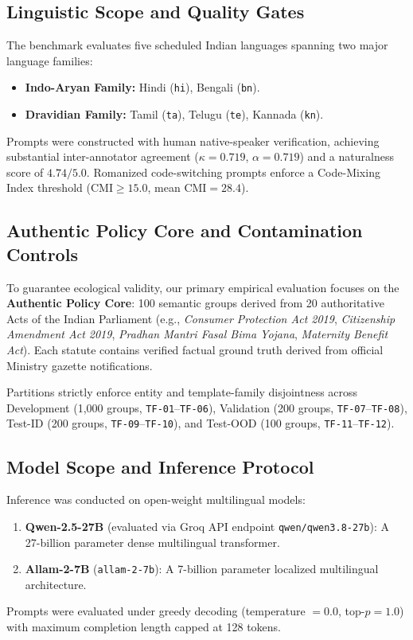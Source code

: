 \documentclass[11pt]{article}
\begin{document}
\subsection{Linguistic Scope and Quality Gates}
The benchmark evaluates five scheduled Indian languages spanning two major language families:
\begin{itemize}
    \item \textbf{Indo-Aryan Family:} Hindi (\texttt{hi}), Bengali (\texttt{bn}).
    \item \textbf{Dravidian Family:} Tamil (\texttt{ta}), Telugu (\texttt{te}), Kannada (\texttt{kn}).
\end{itemize}
Prompts were constructed with human native-speaker verification, achieving substantial inter-annotator agreement ($\kappa = 0.719$, $\alpha = 0.719$) and a naturalness score of $4.74 / 5.0$. Romanized code-switching prompts enforce a Code-Mixing Index \citep{gamback2014comparing} threshold ($\text{CMI} \ge 15.0$, mean $\text{CMI} = 28.4$).

\subsection{Authentic Policy Core and Contamination Controls}
To guarantee ecological validity, our primary empirical evaluation focuses on the \textbf{Authentic Policy Core}: 100 semantic groups derived from 20 authoritative Acts of the Indian Parliament (e.g., \textit{Consumer Protection Act 2019}, \textit{Citizenship Amendment Act 2019}, \textit{Pradhan Mantri Fasal Bima Yojana}, \textit{Maternity Benefit Act}). Each statute contains verified factual ground truth derived from official Ministry gazette notifications. 

Partitions strictly enforce entity and template-family disjointness across Development (1,000 groups, \texttt{TF-01}--\texttt{TF-06}), Validation (200 groups, \texttt{TF-07}--\texttt{TF-08}), Test-ID (200 groups, \texttt{TF-09}--\texttt{TF-10}), and Test-OOD (100 groups, \texttt{TF-11}--\texttt{TF-12}).

\subsection{Model Scope and Inference Protocol}
Inference was conducted on open-weight multilingual models:
\begin{enumerate}
    \item \textbf{Qwen-2.5-27B} (evaluated via Groq API endpoint \texttt{qwen/qwen3.8-27b}): A 27-billion parameter dense multilingual transformer.
    \item \textbf{Allam-2-7B} (\texttt{allam-2-7b}): A 7-billion parameter localized multilingual architecture.
\end{enumerate}
Prompts were evaluated under greedy decoding (temperature $= 0.0$, top-$p = 1.0$) with maximum completion length capped at 128 tokens.
\end{document}
